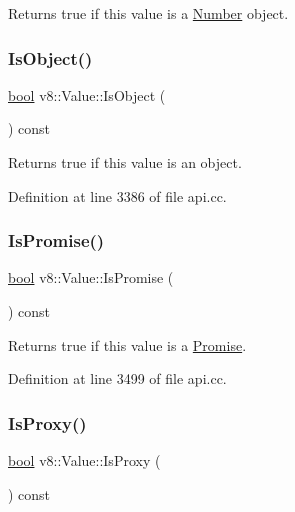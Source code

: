 Returns true if this value is a \mbox{\hyperlink{classv8_1_1Number}{Number}} object. \mbox{\label{classv8_1_1Value_a72a01e06e897a8fedbb430cdd7fc3ffe}} 
\subsubsection{\texorpdfstring{Is\+Object()}{IsObject()}}
{\footnotesize\ttfamily \mbox{\hyperlink{classbool}{bool}} v8\+::\+Value\+::\+Is\+Object (\begin{DoxyParamCaption}{ }\end{DoxyParamCaption}) const}

Returns true if this value is an object. 

Definition at line 3386 of file api.\+cc.

\mbox{\label{classv8_1_1Value_a4b0be5d9dc3a857fee9ba7dac07123e3}} 
\subsubsection{\texorpdfstring{Is\+Promise()}{IsPromise()}}
{\footnotesize\ttfamily \mbox{\hyperlink{classbool}{bool}} v8\+::\+Value\+::\+Is\+Promise (\begin{DoxyParamCaption}{ }\end{DoxyParamCaption}) const}

Returns true if this value is a \mbox{\hyperlink{classv8_1_1Promise}{Promise}}. 

Definition at line 3499 of file api.\+cc.

\mbox{\label{classv8_1_1Value_a3c0ad01f2ca4ac050ef8214785848918}} 
\subsubsection{\texorpdfstring{Is\+Proxy()}{IsProxy()}}
{\footnotesize\ttfamily \mbox{\hyperlink{classbool}{bool}} v8\+::\+Value\+::\+Is\+Proxy (\begin{DoxyParamCaption}{ }\end{DoxyParamCaption}) const}

